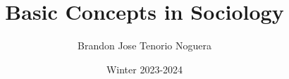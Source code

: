 \documentclass[12pt]{article}
\title{\textbf{Basic Concepts in Sociology}}
\author{Brandon Jose Tenorio Noguera}
\date{Winter 2023-2024}
\begin{document}
\begin{titlingpage}
\maketitle
\end{titlingpage}

\tableofcontents
\newpage
\end{document}
